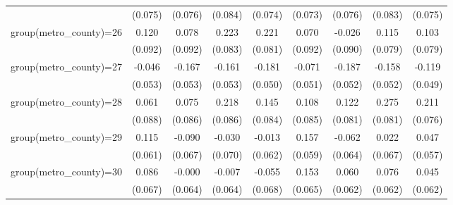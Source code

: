 {\begin{tabular}{l*{8}{c}}
                    &     (0.075)         &     (0.076)         &     (0.084)         &     (0.074)         &     (0.073)         &     (0.076)         &     (0.083)         &     (0.075)         \\
group(metro\_county)=26&       0.120         &       0.078         &       0.223\sym{**} &       0.221\sym{**} &       0.070         &      -0.026         &       0.115         &       0.103         \\
                    &     (0.092)         &     (0.092)         &     (0.083)         &     (0.081)         &     (0.092)         &     (0.090)         &     (0.079)         &     (0.079)         \\
group(metro\_county)=27&      -0.046         &      -0.167\sym{***}&      -0.161\sym{***}&      -0.181\sym{***}&      -0.071         &      -0.187\sym{***}&      -0.158\sym{***}&      -0.119\sym{**} \\
                    &     (0.053)         &     (0.053)         &     (0.053)         &     (0.050)         &     (0.051)         &     (0.052)         &     (0.052)         &     (0.049)         \\
group(metro\_county)=28&       0.061         &       0.075         &       0.218\sym{**} &       0.145\sym{*}  &       0.108         &       0.122         &       0.275\sym{***}&       0.211\sym{**} \\
                    &     (0.088)         &     (0.086)         &     (0.086)         &     (0.084)         &     (0.085)         &     (0.081)         &     (0.081)         &     (0.076)         \\
group(metro\_county)=29&       0.115\sym{*}  &      -0.090         &      -0.030         &      -0.013         &       0.157\sym{**} &      -0.062         &       0.022         &       0.047         \\
                    &     (0.061)         &     (0.067)         &     (0.070)         &     (0.062)         &     (0.059)         &     (0.064)         &     (0.067)         &     (0.057)         \\
group(metro\_county)=30&       0.086         &      -0.000         &      -0.007         &      -0.055         &       0.153\sym{**} &       0.060         &       0.076         &       0.045         \\
                    &     (0.067)         &     (0.064)         &     (0.064)         &     (0.068)         &     (0.065)         &     (0.062)         &     (0.062)         &     (0.062)         \\

\end{tabular}}

